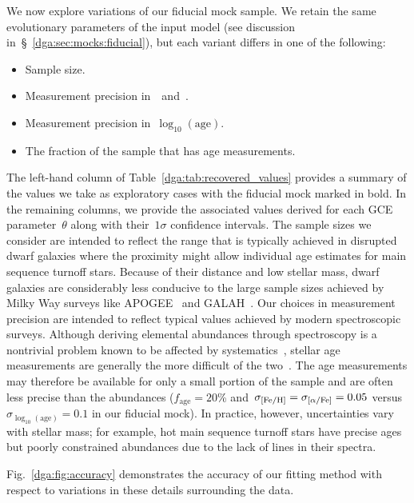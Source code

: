 We now explore variations of our fiducial mock sample.
We retain the same evolutionary parameters of the input model (see discussion
in~\S~\ref{dga:sec:mocks:fiducial}), but each variant differs in one of the
following:
\begin{itemize}

	\item Sample size.

	\item Measurement precision in~\feh~and~\afe.

	\item Measurement precision in~$\log_{10}(\text{age})$.

	\item The fraction of the sample that has age measurements.

\end{itemize}
The left-hand column of Table~\ref{dga:tab:recovered_values} provides a summary of
the values we take as exploratory cases with the fiducial mock marked in bold.
In the remaining columns, we provide the associated values derived for each
GCE parameter~$\theta$ along with their~$1\sigma$ confidence intervals.
The sample sizes we consider are intended to reflect the range that is
typically achieved in disrupted dwarf galaxies where the proximity might
allow individual age estimates for main sequence turnoff stars.
Because of their distance and low stellar mass, dwarf galaxies are considerably
less conducive to the large sample sizes achieved by Milky Way surveys like
APOGEE~\citep{Majewski2017} and GALAH~\citep{DeSilva2015, Martell2017}.
Our choices in measurement precision are intended to reflect typical values
achieved by modern spectroscopic surveys.
Although deriving elemental abundances through spectroscopy is a nontrivial
problem known to be affected by systematics~\citep[e.g.,][]{Anguiano2018},
stellar age measurements
are generally the more difficult of the two~\citep{Soderblom2010, Chaplin2013}.
The age measurements may therefore be available for only a small portion of the
sample and are often less precise than the abundances ($f_\text{age} = 20$\%
and~$\sigma_{\text{[Fe/H]}} = \sigma_{\text{[$\alpha$/Fe]}} = 0.05$ versus
$\sigma_{\log_{10}(\text{age})} = 0.1$ in our fiducial mock).
In practice, however, uncertainties vary with stellar mass; for example, hot
main sequence turnoff stars have precise ages but poorly constrained
abundances due to the lack of lines in their spectra.
\par
Fig.~\ref{dga:fig:accuracy} demonstrates the accuracy of our fitting method with
respect to variations in these details surrounding the data.
